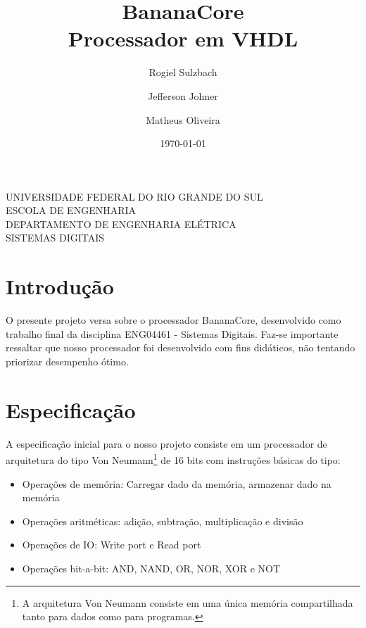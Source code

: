 \documentclass[11pt]{report}
\begin{document}
\title{\textbf{BananaCore}\\{\LARGE Processador em VHDL}}
\author{
  Rogiel Sulzbach
  \and
  Jefferson Johner
  \and
  Matheus Oliveira
}
\date{\today}

\begin{titlepage} \center
	{
		UNIVERSIDADE FEDERAL DO RIO GRANDE DO SUL\\
		ESCOLA DE ENGENHARIA\\
		DEPARTAMENTO DE ENGENHARIA ELÉTRICA\\
		SISTEMAS DIGITAIS
	}
	
	\vfill
	
	{\Huge
		\thetitle
	}
	
	\vfill
	
	{\Large
		\theauthor
	}
	
	\vfill
	
	{\small
		\thedate
	}
\end{titlepage}

\tableofcontents

\chapter{Introdução}

O presente projeto versa sobre o processador BananaCore, desenvolvido como trabalho final da disciplina ENG04461 - Sistemas Digitais. Faz-se importante ressaltar que nosso processador foi desenvolvido com fins didáticos, não tentando priorizar desempenho ótimo.

\chapter{Especificação}

A especificação inicial para o nosso projeto consiste em um processador de arquitetura do tipo Von Neumann\footnote{A arquitetura Von Neumann consiste em uma única memória compartilhada tanto para dados como para programas.} de 16 bits com instruções básicas do tipo:

\begin{itemize}
	\item Operações de memória: Carregar dado da memória, armazenar dado na memória
	\item Operações aritméticas: adição, subtração, multiplicação e divisão
	\item Operações de IO: Write port e Read port
	\item Operações bit-a-bit: AND, NAND, OR, NOR, XOR e NOT
\end{itemize}
\end{document}
